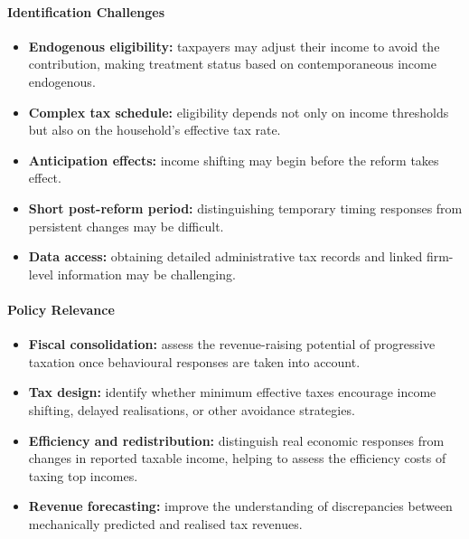 \documentclass{article}
\begin{document}
\paragraph{Identification Challenges}
\begin{itemize}
    \item \textbf{Endogenous eligibility:} taxpayers may adjust their income to avoid the contribution, making treatment status based on contemporaneous income endogenous.
    \item \textbf{Complex tax schedule:} eligibility depends not only on income thresholds but also on the household's effective tax rate.
    \item \textbf{Anticipation effects:} income shifting may begin before the reform takes effect.
    \item \textbf{Short post-reform period:} distinguishing temporary timing responses from persistent changes may be difficult.
    \item \textbf{Data access:} obtaining detailed administrative tax records and linked firm-level information may be challenging.
\end{itemize}

\paragraph{Policy Relevance}
\begin{itemize}
    \item \textbf{Fiscal consolidation:} assess the revenue-raising potential of progressive taxation once behavioural responses are taken into account.
    \item \textbf{Tax design:} identify whether minimum effective taxes encourage income shifting, delayed realisations, or other avoidance strategies.
    \item \textbf{Efficiency and redistribution:} distinguish real economic responses from changes in reported taxable income, helping to assess the efficiency costs of taxing top incomes.
    \item \textbf{Revenue forecasting:} improve the understanding of discrepancies between mechanically predicted and realised tax revenues.
\end{itemize}

\printbibliography
\end{document}
